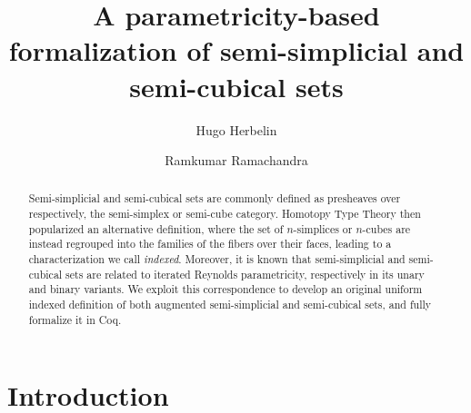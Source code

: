 \documentclass{msc}
\begin{document}
\title{A parametricity-based formalization of semi-simplicial and semi-cubical sets}
\begin{authgrp}
  \author{Hugo Herbelin}
  \author{Ramkumar Ramachandra}
\end{authgrp}
\begin{abstract}
  Semi-simplicial and semi-cubical sets are commonly defined as presheaves over respectively, the semi-simplex or semi-cube category. Homotopy Type Theory then popularized an alternative definition, where the set of $n$-simplices or $n$-cubes are instead regrouped into the families of the fibers over their faces, leading to a characterization we call \emph{indexed}. Moreover, it is known that semi-simplicial and semi-cubical sets are related to iterated Reynolds parametricity, respectively in its unary and binary variants. We exploit this correspondence to develop an original uniform indexed definition of both augmented semi-simplicial and semi-cubical sets, and fully formalize it in Coq.
\end{abstract}
\maketitle
\vspace{-2em} %

\section{Introduction}
\end{document}
